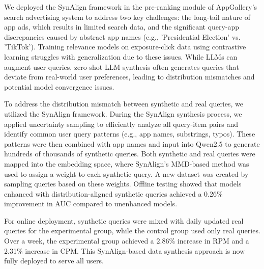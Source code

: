We deployed the SynAlign framework in the pre-ranking module of AppGallery's search advertising system to address two key challenges: the long-tail nature of app ads, which results in limited search data, and the significant query-app discrepancies caused by abstract app names (e.g., 'Presidential Election' vs. 'TikTok'). Training relevance models on exposure-click data using contrastive learning struggles with generalization due to these issues. While LLMs can augment user queries, zero-shot LLM synthesis often generates queries that deviate from real-world user preferences, leading to distribution mismatches and potential model convergence issues.

To address the distribution mismatch between synthetic and real queries, we utilized the SynAlign framework. During the SynAlign synthesis process, we applied uncertainty sampling to efficiently analyze all query-item pairs and identify common user query patterns (e.g., app names, substrings, typos). These patterns were then combined with app names and input into Qwen2.5 to generate hundreds of thousands of synthetic queries. Both synthetic and real queries were mapped into the embedding space, where SynAlign’s MMD-based method was used to assign a weight to each synthetic query. A new dataset was created by sampling queries based on these weights. Offline testing showed that models enhanced with distribution-aligned synthetic queries achieved a 0.26\% improvement in AUC compared to unenhanced models.

For online deployment, synthetic queries were mixed with daily updated real queries for the experimental group, while the control group used only real queries. Over a week, the experimental group achieved a 2.86\% increase in RPM and a 2.31\% increase in CPM. This SynAlign-based data synthesis approach is now fully deployed to serve all users.